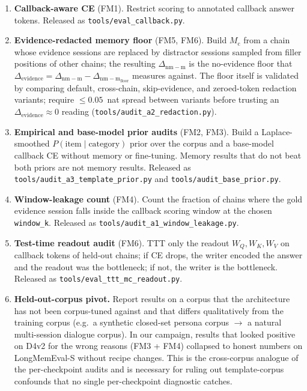 \documentclass{article}
\newcommand{\Mc}{M_{\mathrm{c}}}
\newcommand{\dnm}{\Delta_{\mathrm{nm-m}}}
\newcommand{\elift}{\Delta_{\mathrm{evidence}}}
\begin{document}
\begin{enumerate}\setlength{\itemsep}{0.5pt}
\item \textbf{Callback-aware CE} (FM1).  Restrict scoring to
annotated callback answer tokens.  Released as
\texttt{tools/eval\_callback.py}.
\item \textbf{Evidence-redacted memory floor} (FM5, FM6).  Build
$\Mc$ from a chain whose evidence sessions are replaced by
distractor sessions sampled from filler positions of other chains;
the resulting $\dnm$ is the no-evidence floor that
$\elift = \dnm - \dnm_{\mathrm{floor}}$ measures against.  The
floor itself is validated by comparing default, cross-chain,
skip-evidence, and zeroed-token redaction variants; require $\le
0.05$~nat spread between variants before trusting an
$\elift \approx 0$ reading
(\texttt{tools/audit\_a2\_redaction.py}).
\item \textbf{Empirical and base-model prior audits} (FM2, FM3).
Build a Laplace-smoothed $P(\text{item}\mid\text{category})$ prior
over the corpus and a base-model callback CE without memory or
fine-tuning.  Memory results that do not beat both priors are not
memory results.  Released as
\texttt{tools/audit\_a3\_template\_prior.py} and
\texttt{tools/audit\_base\_prior.py}.
\item \textbf{Window-leakage count} (FM4).  Count the fraction of
chains where the gold evidence session falls inside the callback
scoring window at the chosen \texttt{window\_k}.  Released as
\texttt{tools/audit\_a1\_window\_leakage.py}.
\item \textbf{Test-time readout audit} (FM6).  TTT only the readout
$W_Q,W_K,W_V$ on callback tokens of held-out chains; if CE drops,
the writer encoded the answer and the readout was the bottleneck;
if not, the writer is the bottleneck.  Released as
\texttt{tools/eval\_ttt\_mc\_readout.py}.
\item \textbf{Held-out-corpus pivot.}  Report results on a corpus
that the architecture has not been corpus-tuned against and that
differs qualitatively from the training corpus (e.g.\ a synthetic
closed-set persona corpus $\to$ a natural multi-session dialogue
corpus).  In our campaign, results that looked positive on D4v2 for
the wrong reasons (FM3 + FM4) collapsed to honest numbers on
LongMemEval-S without recipe changes.  This is the cross-corpus
analogue of the per-checkpoint audits and is necessary for
ruling out template-corpus confounds that no single per-checkpoint
diagnostic catches.
\end{enumerate}
\end{document}

